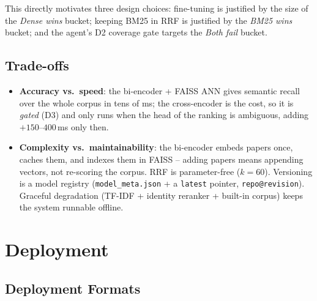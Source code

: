 \documentclass[12pt,a4paper]{article}
\begin{document}
This directly motivates three design choices: fine-tuning is justified by the size of the \emph{Dense wins} bucket; keeping BM25 in RRF is justified by the \emph{BM25 wins} bucket; and the agent's D2 coverage gate targets the \emph{Both fail} bucket.

\subsection{Trade-offs}

\begin{itemize}\setlength\itemsep{0.15em}
  \item \textbf{Accuracy vs.\ speed}: the bi-encoder + FAISS ANN gives semantic recall over the whole corpus in tens of ms; the cross-encoder is the cost, so it is \emph{gated} (D3) and only runs when the head of the ranking is ambiguous, adding $+150$--$400$\,ms only then.
  \item \textbf{Complexity vs.\ maintainability}: the bi-encoder embeds papers once, caches them, and indexes them in FAISS -- adding papers means appending vectors, not re-scoring the corpus. RRF is parameter-free ($k=60$). Versioning is a model registry (\texttt{model\_meta.json} + a \texttt{latest} pointer, \texttt{repo@revision}). Graceful degradation (TF-IDF + identity reranker + built-in corpus) keeps the system runnable offline.
\end{itemize}

\section{Deployment}

\subsection{Deployment Formats}
\end{document}
